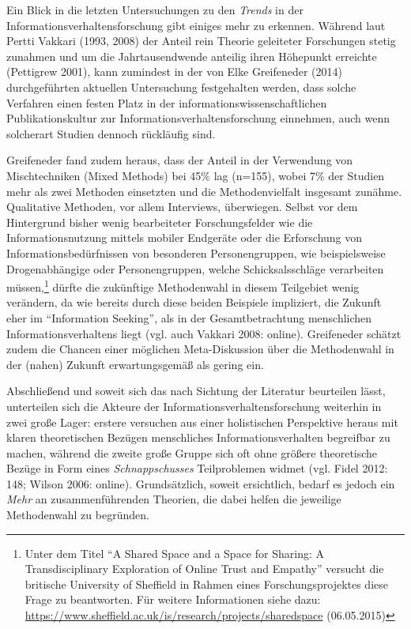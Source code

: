 \documentclass[a4paper,
fontsize=11pt,
oneside,
numbers=noperiodatend,
parskip=half-,
bibliography=totoc,
final
]{scrartcl}
\begin{document}
Ein Blick in die letzten Untersuchungen zu den \emph{Trends} in der
Informationsverhaltensforschung gibt einiges mehr zu erkennen. Während
laut Pertti Vakkari (1993, 2008) der Anteil rein Theorie geleiteter
Forschungen stetig zunahmen und um die Jahrtausendwende anteilig ihren
Höhepunkt erreichte (Pettigrew 2001), kann zumindest in der von Elke
Greifeneder (2014) durchgeführten aktuellen Untersuchung festgehalten
werden, dass solche Verfahren einen festen Platz in der
informationswissenschaftlichen Publikationskultur zur
Informationsverhaltensforschung einnehmen, auch wenn solcherart Studien
dennoch rückläufig sind.

Greifeneder fand zudem heraus, dass der Anteil in der Verwendung von
Mischtechniken (Mixed Methods) bei 45\% lag (n=155), wobei 7\% der
Studien mehr als zwei Methoden einsetzten und die Methodenvielfalt
insgesamt zunähme. Qualitative Methoden, vor allem Interviews,
überwiegen. Selbst vor dem Hintergrund bisher wenig bearbeiteter
Forschungsfelder wie die Informationsnutzung mittels mobiler Endgeräte
oder die Erforschung von Informationsbedürfnissen von besonderen
Personengruppen, wie beispielsweise Drogenabhängige oder
Personengruppen, welche Schicksalsschläge verarbeiten müssen,\footnote{Unter
  dem Titel \enquote{A Shared Space and a Space for Sharing: A
  Transdisciplinary Exploration of Online Trust and Empathy} versucht
  die britische University of Sheffield in Rahmen eines
  Forschungsprojektes diese Frage zu beantworten. Für weitere
  Informationen siehe dazu:
  \href{styles.xml}{https://www.sheffield.ac.uk/is/research/projects/sharedspace}
  (06.05.2015)} dürfte die zukünftige Methodenwahl in diesem Teilgebiet
wenig verändern, da wie bereits durch diese beiden Beispiele impliziert,
die Zukunft eher im \enquote{Information Seeking}, als in der
Gesamtbetrachtung menschlichen Informationsverhaltens liegt (vgl. auch
Vakkari 2008: online). Greifeneder schätzt zudem die Chancen einer
möglichen Meta-Diskussion über die Methodenwahl in der (nahen) Zukunft
erwartungsgemäß als gering ein.

Abschließend und soweit sich das nach Sichtung der Literatur beurteilen
lässt, unterteilen sich die Akteure der Informationsverhaltensforschung
weiterhin in zwei große Lager: erstere versuchen aus einer holistischen
Perspektive heraus mit klaren theoretischen Bezügen menschliches
Informationsverhalten begreifbar zu machen, während die zweite große
Gruppe sich oft ohne größere theoretische Bezüge in Form eines
\emph{Schnappschusses} Teilproblemen widmet (vgl. Fidel 2012: 148;
Wilson 2006: online). Grundsätzlich, soweit ersichtlich, bedarf es
jedoch ein \emph{Mehr} an zusammenführenden Theorien, die dabei helfen
die jeweilige Methodenwahl zu begründen.
\end{document}
